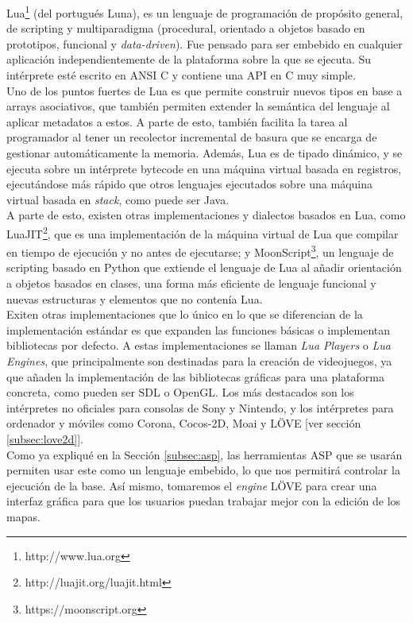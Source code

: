 Lua\footnote{http://www.lua.org} \cite{Ierusalimschy:2016:PLF:3002843} (del portugués Luna), es un lenguaje de programación de propósito general, de scripting y multiparadigma (procedural, orientado a objetos basado en prototipos, funcional y \textit{data-driven}). Fue pensado para ser embebido en cualquier aplicación independientemente de la plataforma sobre la que se ejecuta. Su intérprete esté escrito en ANSI C y contiene una API en C muy simple. \\

Uno de los puntos fuertes de Lua es que permite construir nuevos tipos en base a arrays asociativos, que también permiten extender la semántica del lenguaje al aplicar metadatos a estos. A parte de esto, también facilita la tarea al programador al tener un recolector incremental de basura que se encarga de gestionar automáticamente la memoria. Además, Lua es de tipado dinámico, y se ejecuta sobre un intérprete bytecode en una máquina virtual basada en registros, ejecutándose más rápido que otros lenguajes ejecutados sobre una máquina virtual basada en \textit{stack}, como puede ser Java. \\

A parte de esto, existen otras implementaciones y dialectos basados en Lua, como LuaJIT\footnote{http://luajit.org/luajit.html}, que es una implementación de la máquina virtual de Lua que compilar en tiempo de ejecución y no antes de ejecutarse; y MoonScript\footnote{https://moonscript.org}, un lenguaje de scripting basado en Python que extiende el lenguaje de Lua al añadir orientación a objetos basados en clases, una forma más eficiente de lenguaje funcional y nuevas estructuras y elementos que no contenía Lua. \\

Exiten otras implementaciones que lo único en lo que se diferencian de la implementación estándar es que expanden las funciones básicas o implementan bibliotecas por defecto. A estas implementaciones se llaman \textit{Lua Players} o \textit{Lua Engines}, que principalmente son destinadas para la creación de videojuegos, ya que añaden la implementación de las bibliotecas gráficas para una plataforma concreta, como pueden ser SDL o OpenGL. Los más destacados son los intérpretes no oficiales para consolas de Sony y Nintendo, y los intérpretes para ordenador y móviles como Corona, Cocos-2D, Moai y LÖVE [ver sección \ref{subsec:love2d}]. \\

Como ya expliqué en la Sección \ref{subsec:asp}, las herramientas ASP que se usarán permiten usar este como un lenguaje embebido, lo que nos permitirá controlar la ejecución de la base. Así mismo, tomaremos el \textit{engine} LÖVE para crear una interfaz gráfica para que los usuarios puedan trabajar mejor con la edición de los mapas.

